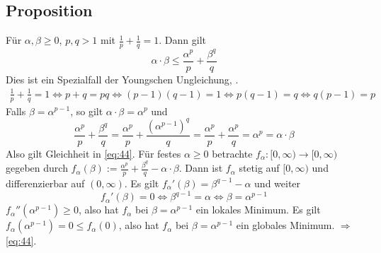 \subsection[Proposition: Speziallfall der Youngschen Ungleichung]{Proposition} %
\label{sub:44}
Für $\alpha, \beta \ge 0$, $p,q >1$ mit $\frac{1}{p} + \frac{1}{q}=1$. Dann gilt 
\begin{equation*}
	\alpha \cdot \beta \le \frac{\alpha^p}{p} + \frac{\beta^q}{q}  \label{eq:44}\tag{\#}
\end{equation*}
Dies ist ein Spezialfall der Youngschen Ungleichung,  .
\begin{align*}
	\frac{1}{p} + \frac{1}{q}=1 \iff p+q= pq \iff (p-1)(q-1)= 1 \iff p (q-1) = q \iff q (p-1) =p
\end{align*}
Falls $\beta = \alpha^{p-1}$, so gilt $\alpha \cdot \beta = \alpha^p$ und 
\[
	\frac{\alpha^p}{p} + \frac{\beta^q}{q} = \frac{\alpha^p}{p} + \frac{(\alpha^{p-1})^q}{q} = \frac{\alpha^p}{p} + \frac{\alpha^p}{q} = \alpha^p = \alpha \cdot \beta   
\]
Also gilt Gleichheit in \eqref{eq:44}. Für festes $\alpha \ge 0$ betrachte $f_\alpha : [0,\infty) \to [0,\infty)$ gegeben durch
$f_\alpha(\beta) := \frac{\alpha^p}{p} + \frac{\beta^q}{q} - \alpha \cdot \beta$. Dann ist $f_\alpha$ stetig auf $[0,\infty)$ und differenzierbar auf $(0,\infty)$. Es gilt
$f_\alpha'(\beta) = \beta^{q-1} -\alpha$ und weiter
\[
	f_\alpha'(\beta)=0 \iff \beta^{q-1} = \alpha \iff \beta= \alpha^{p-1}
\]
$f_\alpha''(\alpha^{p-1}) \ge 0$, also hat $f_\alpha$ bei $\beta = \alpha^{p-1}$ ein lokales Minimum. Es gilt $f_\alpha(\alpha^{p-1})= 0 \le f_\alpha(0)$, also
hat $f_\alpha$ bei $\beta=\alpha^{p-1}$ ein globales Minimum. $\Rightarrow $ \eqref{eq:44}. \bewende

